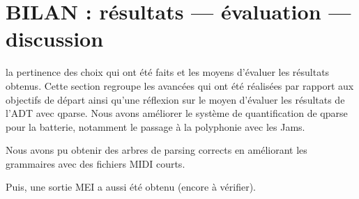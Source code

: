 \section{BILAN : résultats — évaluation — discussion}
la pertinence des choix qui ont été faits et les moyens d’évaluer les
résultats obtenus.
Cette section regroupe les avancées qui ont été réalisées par rapport aux
objectifs de départ ainsi qu’une réflexion sur le moyen d’évaluer les résultats
de l’ADT avec qparse. Nous avons améliorer le système de quantification de
qparse pour la batterie, notamment le passage à la polyphonie avec les Jams. 

Nous avons pu obtenir des arbres de parsing corrects en améliorant les
grammaires avec des fichiers MIDI courts. 

Puis, une sortie MEI a aussi été obtenu (encore à vérifier).



